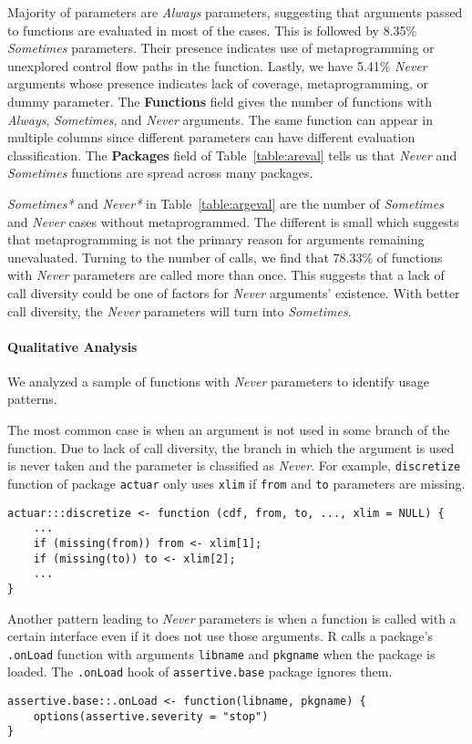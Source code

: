 \documentclass[screen,acmsmall]{acmart}
\newcommand{\always}{\emph{Always}\xspace}
\newcommand{\sometimes}{\emph{Sometimes}\xspace}
\newcommand{\sometimesStar}{\emph{Sometimes*}\xspace}
\newcommand{\never}{\emph{Never}\xspace}
\newcommand{\neverStar}{\emph{Never*}\xspace}
\newcommand{\code}[1]{\lstinline[style=R]|#1|\xspace}
\begin{document}
Majority of parameters are \always parameters, suggesting that arguments passed
to functions are evaluated in most of the cases. This is followed by 8.35\%
\sometimes parameters. Their presence indicates use of metaprogramming or
unexplored control flow paths in the function. Lastly, we have 5.41\% \never
arguments whose presence indicates lack of coverage, metaprogramming, or dummy
parameter. The \textbf{Functions} field gives the number of functions with
\always, \sometimes, and \never arguments. The same function can appear in
multiple columns since different parameters can have different evaluation
classification. The \textbf{Packages} field of Table~\ref{table:areval} tells us
that \never and \sometimes functions are spread across many packages.


\sometimesStar and \neverStar in Table~\ref{table:argeval} are the number of
\sometimes and \never cases without metaprogrammed. The different is small which
suggests that metaprogramming is not the primary reason for arguments remaining
unevaluated. Turning to the number of calls, we find that 78.33\% of functions
with \never parameters are called more than once. This suggests that a lack of
call diversity could be one of factors for \never arguments' existence. With
better call diversity, the \never parameters will turn into \sometimes.

\paragraph{Qualitative Analysis}

We analyzed a sample of functions with \never parameters to identify usage
patterns.

The most common case is when an argument is not used in some branch of the
function. Due to lack of call diversity, the branch in which the argument is
used is never taken and the parameter is classified as \never. For example,
\code{discretize} function of package \code{actuar} only uses \code{xlim} if
\code{from} and \code{to} parameters are missing.
\begin{lstlisting}
actuar:::discretize <- function (cdf, from, to, ..., xlim = NULL) {
    ...
    if (missing(from)) from <- xlim[1];
    if (missing(to)) to <- xlim[2];
    ...
}
\end{lstlisting}


Another pattern leading to \never parameters is when a function is called with a
certain interface even if it does not use those arguments. R calls a package's
\code{.onLoad} function with arguments \code{libname} and \code{pkgname} when
the package is loaded. The \code{.onLoad} hook of \code{assertive.base} package
ignores them.
\begin{lstlisting}
assertive.base::.onLoad <- function(libname, pkgname) {
    options(assertive.severity = "stop")
}
\end{lstlisting}
\end{document}
